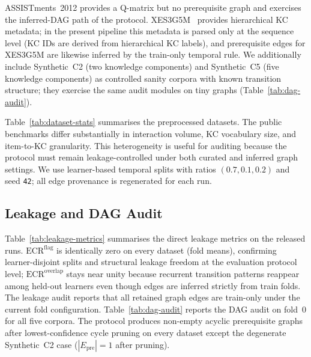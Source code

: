 \documentclass[runningheads]{llncs}
\newcommand{\Epre}{\ensuremath{E_{\text{pre}}}}
\newcommand{\KCs}{knowledge components}
\begin{document}
ASSISTments~2012 provides a Q-matrix but no prerequisite graph and
exercises the inferred-DAG path of the protocol. XES3G5M~\cite{xes3g5m2023}
provides hierarchical KC metadata; in the present pipeline this metadata
is parsed only at the sequence level (KC IDs are derived from
hierarchical KC labels), and prerequisite edges for XES3G5M are likewise
inferred by the train-only temporal rule. We additionally include
Synthetic~C2 (two \KCs{}) and Synthetic~C5 (five \KCs{}) as controlled
sanity corpora with known transition structure; they exercise the same
audit modules on tiny graphs (Table~\ref{tab:dag-audit}).

Table~\ref{tab:dataset-stats} summarises the preprocessed datasets.
The public benchmarks differ substantially in interaction volume, KC
vocabulary size, and item-to-KC granularity. This heterogeneity is
useful for auditing because the protocol must remain leakage-controlled
under both curated and inferred graph settings. We use learner-based
temporal splits with ratios $(0.7,0.1,0.2)$ and seed \texttt{42}; all
edge provenance is regenerated for each run.
\subsection{Leakage and DAG Audit}
\label{sec:exp-audit}


Table~\ref{tab:leakage-metrics} summarises the direct leakage metrics on
the released runs. $\mathrm{ECR}^{\mathrm{flag}}$ is identically zero on every dataset (fold means), confirming learner-disjoint splits and structural leakage freedom at the evaluation protocol level; $\mathrm{ECR}^{\mathrm{overlap}}$ stays near unity because recurrent transition patterns reappear among held-out learners even though edges are inferred strictly from train folds.
The leakage audit reports that all retained graph edges are train-only
under the current fold configuration. Table~\ref{tab:dag-audit} reports
the DAG audit on fold~0 for all five corpora. The protocol produces
non-empty acyclic prerequisite graphs after lowest-confidence cycle
pruning on every dataset except the degenerate Synthetic~C2 case
($|\Epre|{=}1$ after pruning).
\end{document}

